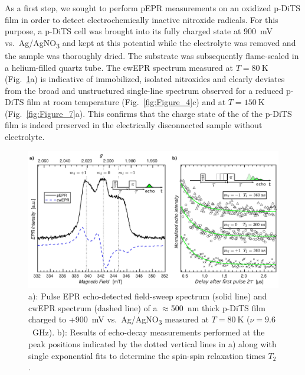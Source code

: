 \par
As a first step, we sought to perform pEPR measurements on an oxidized p-DiTS film in order to detect electrochemically inactive nitroxide radicals. For this purpose, a p-DiTS cell was brought into its fully charged state at 900~mV vs.\ Ag/AgNO\textsubscript{3} and kept at this potential while the electrolyte was removed and the sample was thoroughly dried. The substrate was subsequently flame-sealed in a helium-filled quartz tube. The cwEPR spectrum measured at $T = 80~\textrm{K}$ (Fig.~\ref{fig:Figure_8}a) is indicative of immobilized, isolated nitroxides\cite{bordignon2017_emagres} and clearly deviates from the broad and unstructured single-line spectrum observed for a reduced p-DiTS film at room temperature (Fig.~\ref{fig:Figure_4}c) and at $T = 150~\textrm{K}$ (Fig.~\ref{fig:Figure_7}a). This confirms that the charge state of the of the p-DiTS film is indeed preserved in the electrically disconnected sample without electrolyte.
%
\begin{figure}[ht!]
	\centering
		\includegraphics[width=1\textwidth]{./pulse/figures/SAW_Figure_8.pdf}
	\caption{a): Pulse EPR echo-detected field-sweep spectrum (solid line) and cwEPR spectrum (dashed line) of a $\approx$500~nm thick p-DiTS film charged to +900~mV vs.\ Ag/AgNO\textsubscript{3} measured at $T = 80~\textrm{K}$ ($\nu = 9.6$~GHz). b): Results of echo-decay measurements performed at the peak positions indicated by the dotted vertical lines in a) along with single exponential fits to determine the spin-spin relaxation times $T_2$.}
	\label{fig:Figure_8}
\end{figure}
%
\par
